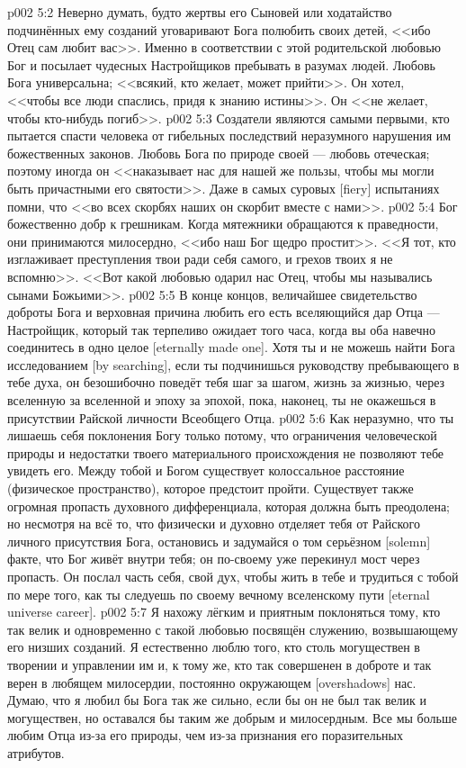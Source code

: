 \vs p002 5:2 \pc Неверно думать, будто жертвы его Сыновей или ходатайство подчинённых ему созданий уговаривают Бога полюбить своих детей, <<ибо Отец сам любит вас>>. Именно в соответствии с этой родительской любовью Бог и посылает чудесных Настройщиков пребывать в разумах людей. Любовь Бога универсальна; <<всякий, кто желает, может прийти>>. Он хотел, <<чтобы все люди спаслись, придя к знанию истины>>. Он <<не желает, чтобы кто\hyp{}нибудь погиб>>.
\vs p002 5:3 Создатели являются самыми первыми, кто пытается спасти человека от гибельных последствий неразумного нарушения им божественных законов. Любовь Бога по природе своей --- любовь отеческая; поэтому иногда он <<наказывает нас для нашей же пользы, чтобы мы могли быть причастными его святости>>. Даже в самых суровых [fiery] испытаниях помни, что <<во всех скорбях наших он скорбит вместе с нами>>.
\vs p002 5:4 Бог божественно добр к грешникам. Когда мятежники обращаются к праведности, они принимаются милосердно, <<ибо наш Бог щедро простит>>. <<Я тот, кто изглаживает преступления твои ради себя самого, и грехов твоих я не вспомню>>. <<Вот какой любовью одарил нас Отец, чтобы мы назывались сынами Божьими>>.
\vs p002 5:5 В конце концов, величайшее свидетельство доброты Бога и верховная причина любить его есть вселяющийся дар Отца --- Настройщик, который так терпеливо ожидает того часа, когда вы оба навечно соединитесь в одно целое [eternally made one]. Хотя ты и не можешь найти Бога исследованием [by searching], если ты подчинишься руководству пребывающего в тебе духа, он безошибочно поведёт тебя шаг за шагом, жизнь за жизнью, через вселенную за вселенной и эпоху за эпохой, пока, наконец, ты не окажешься в присутствии Райской личности Всеобщего Отца.
\vs p002 5:6 \pc Как неразумно, что ты лишаешь себя поклонения Богу только потому, что ограничения человеческой природы и недостатки твоего материального происхождения не позволяют тебе увидеть его. Между тобой и Богом существует колоссальное расстояние (физическое пространство), которое предстоит пройти. Существует также огромная пропасть духовного дифференциала, которая должна быть преодолена; но несмотря на всё то, что физически и духовно отделяет тебя от Райского личного присутствия Бога, остановись и задумайся о том серьёзном [solemn] факте, что Бог живёт внутри тебя; он по\hyp{}своему уже перекинул мост через пропасть. Он послал часть себя, свой дух, чтобы жить в тебе и трудиться с тобой по мере того, как ты следуешь по своему вечному вселенскому пути [eternal universe career].
\vs p002 5:7 Я нахожу лёгким и приятным поклоняться тому, кто так велик и одновременно с такой любовью посвящён служению, возвышающему его низших созданий. Я естественно люблю того, кто столь могуществен в творении и управлении им и, к тому же, кто так совершенен в доброте и так верен в любящем милосердии, постоянно окружающем [overshadows] нас. Думаю, что я любил бы Бога так же сильно, если бы он не был так велик и могуществен, но оставался бы таким же добрым и милосердным. Все мы больше любим Отца из\hyp{}за его природы, чем из\hyp{}за признания его поразительных атрибутов.
